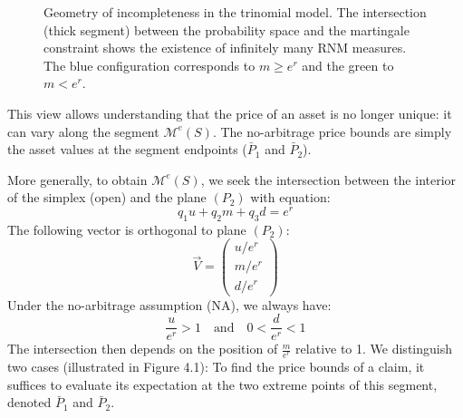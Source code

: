 \begin{figure}[H]
\caption{Geometry of incompleteness in the trinomial model. The intersection (thick segment) between the probability space and the martingale constraint shows the existence of infinitely many RNM measures. The blue configuration corresponds to $m \ge e^r$ and the green to $m < e^r$.}
\end{figure}

\begin{tcolorbox}[title=The Interest of the Geometric View, colback=red!5!white, colframe=red!50!black]
This view allows understanding that the price of an asset is no longer unique: it can vary along the segment $\mathcal{M}^e(S)$. The no-arbitrage price bounds are simply the asset values at the segment endpoints ($\bar{P}_1$ and $\bar{P}_2$).
\end{tcolorbox}

More generally, to obtain $\mathcal{M}^e(S)$, we seek the intersection between the interior of the simplex (open) and the plane $(P_2)$ with equation:
\begin{equation}
    q_1 u + q_2 m + q_3 d = e^r
\end{equation}
The following vector is orthogonal to plane $(P_2)$:
\begin{equation}
    \vec{V} = \begin{pmatrix} u/e^r \\ m/e^r \\ d/e^r \end{pmatrix}
\end{equation}
Under the no-arbitrage assumption (NA), we always have:
\begin{equation}
    \frac{u}{e^r} > 1 \quad \text{and} \quad 0 < \frac{d}{e^r} < 1
\end{equation}
The intersection then depends on the position of $\frac{m}{e^r}$ relative to 1. We distinguish two cases (illustrated in Figure 4.1):
To find the price bounds of a claim, it suffices to evaluate its expectation at the two extreme points of this segment, denoted $\bar{P}_1$ and $\bar{P}_2$.

